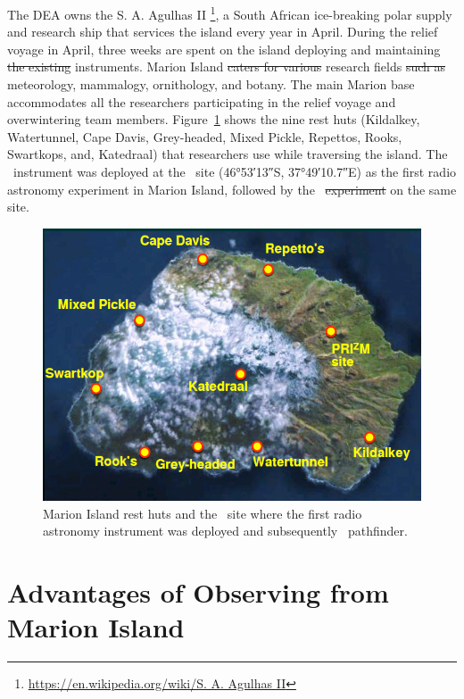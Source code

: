 The DEA owns the S. A. Agulhas II \footnote{\url{https://en.wikipedia.org/wiki/S. A. Agulhas II}}, a South African ice-breaking polar supply and research ship that services the island every year in April. During the relief voyage in April, three weeks are spent on the island deploying and maintaining \st{the existing} instruments. Marion Island \st{caters for various}  research fields  \st{such as} meteorology, mammalogy, ornithology, and botany. The main Marion base accommodates all the researchers participating in the relief voyage and overwintering team members. Figure~\ref{fig:site} shows the nine rest huts (Kildalkey, Watertunnel, Cape Davis, Grey-headed, Mixed Pickle, Repettos, Rooks, Swartkops, and, Katedraal) that researchers use while traversing the island. The \prizm\ instrument was deployed at the \prizm\ site  (\ang{46;53;13}S, \ang{37;49;10.7}E) as the first radio astronomy experiment in Marion Island, followed by the \albatros\ \st{experiment}  on the same site. 

\begin{figure}
	\centering
	\includegraphics[width=\linewidth]{Figures/site}
	\caption{Marion Island rest huts and the \prizm\ site where the first radio astronomy instrument was deployed and subsequently \albatros\ pathfinder.}
	\label{fig:site}
\end{figure}

\section{Advantages of Observing from Marion Island}

